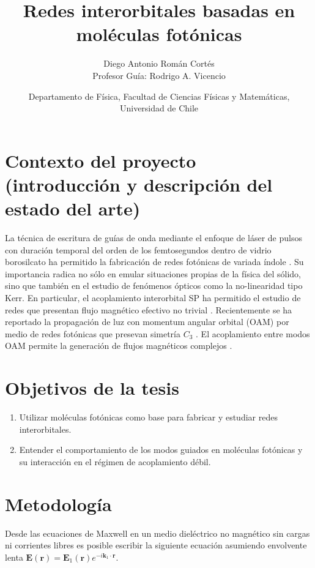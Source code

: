 \documentclass{article}
\author{Diego Antonio Román Cortés\\Profesor Guía: Rodrigo A. Vicencio}
\date{Departamento de Física, Facultad de Ciencias Físicas y Matemáticas, Universidad de Chile}
\title{Redes interorbitales basadas en moléculas fotónicas}
\begin{document}
 \maketitle

\section{Contexto del proyecto (introducción y descripción del estado del arte)}
	La técnica de escritura de guías de onda mediante el enfoque de láser de pulsos con duración temporal del orden de los femtosegundos dentro de vidrio borosilcato ha permitido la fabricación de redes fotónicas de variada índole \cite{bics, artificialFB}. Su importancia radica no sólo en emular situaciones propias de la física del sólido, sino que también en el estudio de fenómenos ópticos como la no-linearidad tipo Kerr.
	En particular, el acoplamiento interorbital SP \cite{interorbital} ha permitido el estudio de redes que presentan flujo magnético efectivo no trivial \cite{OAMcaging, ABCaging}. Recientemente se ha reportado la propagación de luz con momentum angular orbital (OAM) por medio de redes fotónicas que presevan simetría $C_3$ \cite{vortex}. El acoplamiento entre modos OAM permite la generación de flujos magnéticos complejos \cite{vortextrim}.
\section{Objetivos de la tesis}
\begin{enumerate}
	\item Utilizar moléculas fotónicas como base para fabricar y estudiar redes interorbitales.
	\item Entender el comportamiento de los modos guiados en moléculas fotónicas y su interacción en el régimen de acoplamiento débil.
\end{enumerate}
\section{Metodología}

Desde las ecuaciones de Maxwell en un medio dieléctrico no magnético sin cargas ni corrientes libres es posible escribir la siguiente ecuación asumiendo envolvente lenta $\textbf{E}(\textbf{r}) = \textbf{E}_1(\textbf{r}) e^{-i \textbf{k}_1 \cdot \textbf{r}}$.
\end{document}
